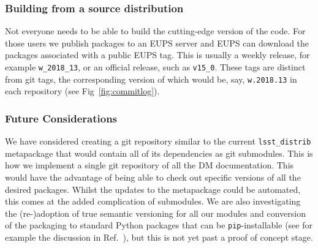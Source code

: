 \subsubsection{Building from a source distribution}

Not everyone needs to be able to build the cutting-edge version of the code. For those users we publish packages to an EUPS server and EUPS can download the packages associated with a public EUPS tag.
This is usually a weekly release, for example \texttt{w\_2018\_13}, or an official release, such as \texttt{v15\_0}.
These tags are distinct from git tags, the corresponding version of which would be, say, \texttt{w.2018.13} in each repository (see Fig~\ref{fig:commitlog}).

\subsubsection{Future Considerations}

We have considered creating a git repository similar to the current \texttt{lsst\_distrib} metapackage that would contain all of its dependencies as git submodules. This is how we implement a single git repository of all the DM documentation.
This would have the advantage of being able to check out specific versions of all the desired packages.  Whilst the updates to the metapackage could be automated, this comes at the added complication of submodules.
We are also investigating the (re-)adoption of true semantic versioning\cite{semver} for all our modules and conversion of the packaging to standard Python packages that can be \texttt{pip}-installable (see for example the discussion in Ref.~), but this is not yet past a proof of concept stage.
